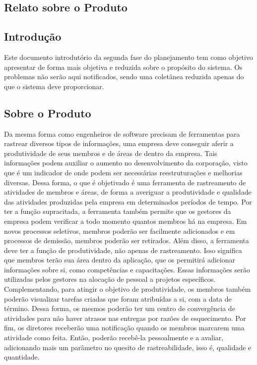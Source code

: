 \begin{apendicesenv}

\chapter{Relato sobre o Produto}


\section{Introdução}

Este documento introdutório da segunda fase do planejamento tem como objetivo apresentar de forma mais objetiva e reduzida sobre o propósito do sistema. Os problemas não serão aqui notificados, sendo uma coletânea reduzida apenas do que o sistema deve proporcionar.

\section{Sobre o Produto}

Da mesma forma como engenheiros de software precisam de ferramentas para rastrear diversos tipos de informações, uma empresa deve conseguir aferir a produtividade de seus membros e de áreas de dentro da empresa.
Tais informações podem auxiliar o aumento no desenvolvimento da corporação, visto que é um indicador de onde podem ser necessárias reestruturações e melhorias diversas.
Dessa forma, o que é objetivado é uma ferramenta de rastreamento de atividades de membros e áreas, de forma a averiguar a produtividade e qualidade das atividades produzidas pela empresa em determinados períodos de tempo.
Por ter a função supracitada, a ferramenta também permite que os gestores da empresa podem verificar a todo momento quantos membros há na empresa. Em novos processos seletivos, membros poderão ser facilmente adicionados e em processos de demissão, membros poderão ser retirados.
Além disso, a ferramenta deve ter a função de produtividade, não apenas de rastreamento. Isso significa que membros terão sua área dentro da aplicação, que os permitirá adicionar informações sobre si, como competências e capacitações. Essas informações serão utilizadas pelos gestores na alocação de pessoal a projetos específicos.
Complementando, para atingir o objetivo de produtividade, os membros também poderão visualizar tarefas criadas que foram atribuídas a si, com a data de término. Dessa forma, os mesmos poderão ter um centro de convergência de atividades para não haver atrasos nas entregas por razões de esquecimento.
Por fim, os diretores receberão uma notificação quando os membros marcarem uma atividade como feita. Então, poderão recebê-la pessoalmente e a avaliar, adicionando mais um parâmetro no quesito de rastreabilidade, isso é, qualidade e quantidade.



\end{apendicesenv}
